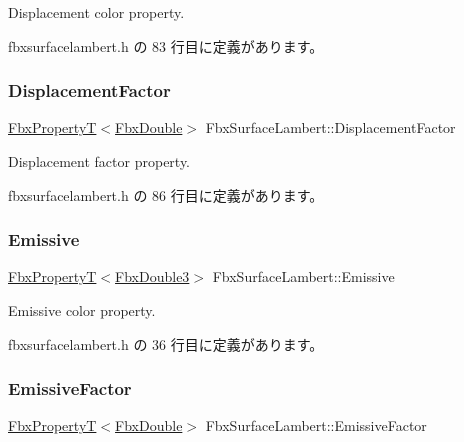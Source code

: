 Displacement color property. 



 fbxsurfacelambert.\+h の 83 行目に定義があります。

\mbox{\label{class_fbx_surface_lambert_a13018502111bc9498c11a9538f90e9d2}} 
\subsubsection{\texorpdfstring{Displacement\+Factor}{DisplacementFactor}}
{\footnotesize\ttfamily \hyperlink{class_fbx_property_t}{Fbx\+PropertyT}$<$\hyperlink{fbxtypes_8h_a171e72a1c46fc15c1a6c9c31948c1c5b}{Fbx\+Double}$>$ Fbx\+Surface\+Lambert\+::\+Displacement\+Factor}



Displacement factor property. 



 fbxsurfacelambert.\+h の 86 行目に定義があります。

\mbox{\label{class_fbx_surface_lambert_a8ca6383b7fe25ea69039b3340affb793}} 
\subsubsection{\texorpdfstring{Emissive}{Emissive}}
{\footnotesize\ttfamily \hyperlink{class_fbx_property_t}{Fbx\+PropertyT}$<$\hyperlink{fbxtypes_8h_ae0a96f14cde566774c7553aa7523b7a7}{Fbx\+Double3}$>$ Fbx\+Surface\+Lambert\+::\+Emissive}



Emissive color property. 



 fbxsurfacelambert.\+h の 36 行目に定義があります。

\mbox{\label{class_fbx_surface_lambert_aad698a7a185c579fdf97131876c474ef}} 
\subsubsection{\texorpdfstring{Emissive\+Factor}{EmissiveFactor}}
{\footnotesize\ttfamily \hyperlink{class_fbx_property_t}{Fbx\+PropertyT}$<$\hyperlink{fbxtypes_8h_a171e72a1c46fc15c1a6c9c31948c1c5b}{Fbx\+Double}$>$ Fbx\+Surface\+Lambert\+::\+Emissive\+Factor}

